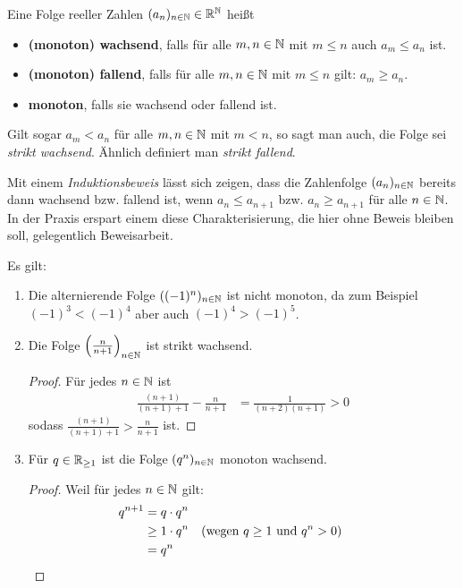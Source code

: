 \begin{defin}[Monotonie]   
    Eine Folge reeller Zahlen $(a_n)_{n\in \mathbb N}\in \mathbb R^\mathbb N$ heißt
    \begin{itemize}
        \item \textbf{(monoton) wachsend}, falls für alle $m,n\in \mathbb N$ mit $m\le n$ auch $a_m\le a_n$ ist.
        \item \textbf{(monoton) fallend}, falls für alle $m,n\in \mathbb N$ mit $m\le n$ gilt: $a_m\ge a_n$.
        \item \textbf{monoton}, falls sie wachsend oder fallend ist.
    \end{itemize}
    Gilt sogar $a_m<a_n$ für alle $m,n\in \mathbb N$ mit $m<n$, so sagt man auch, die Folge sei \emph{strikt wachsend}. Ähnlich definiert man \emph{strikt fallend}.

    Mit einem \emph{Induktionsbeweis} lässt sich zeigen, dass die Zahlenfolge $(a_n)_{n\in \mathbb N}$ bereits dann wachsend bzw. fallend ist, wenn $a_n\le a_{n+1}$ bzw. $a_n\ge a_{n+1}$ für alle $n\in \mathbb N$. In der Praxis erspart einem diese Charakterisierung, die hier ohne Beweis bleiben soll, gelegentlich Beweisarbeit.
\end{defin}


\begin{bsp}
Es gilt:
    \begin{enumerate}
        \item Die alternierende Folge $((-1)^n)_{n\in \mathbb N}$ ist nicht monoton, da zum Beispiel $(-1)^3< (-1)^4$ aber auch $(-1)^4>(-1)^5$.
        \item Die Folge $\left(\frac{n}{n+1}\right)_{n\in \mathbb N}$ ist strikt wachsend.
        \begin{proof}
            Für jedes $n\in \mathbb N$ ist
            \begin{align*}
                \frac{(n+1)}{(n+1)+1} - \frac{n}{n+1} & = \frac{1}{(n+2)(n+1)} >0
            \end{align*}
            sodass $\frac{(n+1)}{(n+1)+1} > \frac{n}{n+1}$ ist.
        \end{proof}
        \item Für $q\in \mathbb R_{\ge 1}$ ist die Folge $(q^n)_{n\in \mathbb N}$ monoton wachsend.
        \begin{proof}
            Weil für jedes $n\in \mathbb N$ gilt:
            \begin{align*}
                q^{n+1} & = q \cdot q^n \\
                & \ge 1 \cdot q^n && (\text{wegen $q\ge 1$ und $q^n>0$})\\
                & = q^n &&&& \qedhere
            \end{align*}
        \end{proof}
    \end{enumerate}
\end{bsp}


